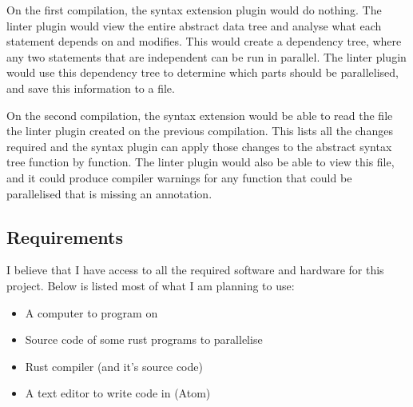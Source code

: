 \documentclass[12pt, a4paper]{article}
\begin{document}
On the first compilation, the syntax extension plugin would do nothing. The linter plugin would view the entire abstract data tree and analyse what each statement depends on and modifies. This would create a dependency tree, where any two statements that are independent can be run in parallel. The linter plugin would use this dependency tree to determine which parts should be parallelised, and save this information to a file.

On the second compilation, the syntax extension would be able to read the file the linter plugin created on the previous compilation. This lists all the changes required and the syntax plugin can apply those changes to the abstract syntax tree function by function. The linter plugin would also be able to view this file, and it could produce compiler warnings for any function that could be parallelised that is missing an annotation.

\subsection{Requirements}
I believe that I have access to all the required software and hardware for this project. Below is listed most of what I am planning to use:
\begin{itemize}
	\item A computer to program on
	\item Source code of some rust programs to parallelise
	\item Rust compiler (and it's source code)
	\item A text editor to write code in (Atom)
\end{itemize}
\end{document}
